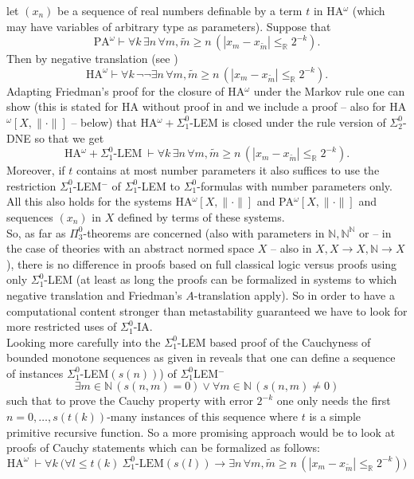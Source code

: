 \documentclass[1p]{elsarticle}
\newcommand{\RR}{\ensuremath{\mathbb{R}}}
\newcommand{\NN}{\ensuremath{\mathbb{N}}}
\theoremstyle{plain}
\theoremstyle{definition}
\theoremstyle{remark}
\theoremstyle{definition}
\begin{document}
let $(x_n)$ be a sequence of real numbers definable by a term $t$ 
in HA$^{\omega}$ 
(which may have variables of arbitrary type as parameters). Suppose that 
\[ \mbox{PA}^{\omega}\vdash \forall k\,\exists n\,\forall m,\tilde{m}\ge n\,
(|x_m-x_{\tilde{m}}|\le_{\RR} 2^{-k}). \]
Then by negative translation (see \cite{Kohlenbach(book)}) 
\[ \mbox{HA}^{\omega}\vdash  \forall k\,\neg\neg 
\exists n\,\forall m,\tilde{m}\ge n\,
(|x_m-x_{\tilde{m}}|\le_{\RR} 2^{-k}). \]
Adapting Friedman's proof for the closure of HA$^{\omega}$ under the Markov 
rule one can show (this is stated for HA without proof in 
\cite{Hayashi/Nakata} and we include a proof -- also for 
HA$^{\omega}[X,\|\cdot\|]$ -- below) that HA$^{\omega}+
\Sigma^0_1$-LEM  
is closed under the rule version of $\Sigma^0_2$-DNE so that we get 
\[ \mbox{HA$^{\omega}+\Sigma^0_1$-LEM} \ 
\vdash \forall k\,\exists n\,\forall m,\tilde{m}\ge n\,
(|x_m-x_{\tilde{m}}|\le_{\RR} 2^{-k}). \] 
Moreover, if $t$ contains at most number parameters it also suffices to 
use the restriction $\Sigma^0_1$-LEM$^-$ of $\Sigma^0_1$-LEM to 
$\Sigma^0_1$-formulas with number parameters only. All this also holds for 
the systems HA$^{\omega}[X,\|\cdot\|]$ and PA$^{\omega}[X,\|\cdot\|]$ 
and sequences $(x_n)$ in $X$ defined by terms of these systems.
\\[2mm] 
So, as far as $\Pi^0_3$-theorems are concerned 
(also with parameters in $\NN,\NN^{\NN}$ 
or -- in the case of theories with an abstract normed space $X$ -- 
also in $X,X\to X, \NN\to X$), there is no difference in proofs based 
on full classical logic versus proofs using only $\Sigma^0_1$-LEM 
(at least as long the proofs can be formalized in systems to which 
negative translation and Friedman's $A$-translation apply). So in 
order to have a computational content stronger than metastability 
guaranteed we have to look for more restricted uses of $\Sigma^0_1$-IA.  
\\  
Looking more carefully into the $\Sigma^0_1$-LEM based proof of the 
Cauchyness of bounded monotone sequences as given in \cite{Toftdal} reveals 
that one can define a sequence of instances $\Sigma^0_1$-LEM$(s(n))$) 
of $\Sigma^0_1$LEM$^-$ 
\[ \exists m\in\NN \,(s(n,m)=0)\vee \forall m\in\NN\,(s(n,m)\not= 0) \] 
such that to prove the Cauchy property with error $2^{-k}$ one only needs 
the first $n=0,\ldots,s(t(k))$-many instances of this sequence where $t$ is 
a simple primitive recursive function. So a more promising approach would be
to look at proofs of Cauchy statements which can be formalized as follows:
\[ \mbox{HA}^{\omega}\ \vdash \forall k \  \big( \forall l\le t(k) \ 
\Sigma^0_1\mbox{-LEM}(s(l))\to \exists n\,\forall m,\tilde{m}\ge n\,
(|x_m-x_{\tilde{m}}|\le_{\RR} 2^{-k})\big) \] 
\end{document}
